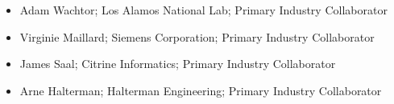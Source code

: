 \documentclass[11pt]{article}
\begin{document}
\begin{itemize}


\item Adam Wachtor; Los Alamos National Lab; Primary Industry Collaborator 

\item Virginie Maillard; Siemens Corporation; Primary Industry Collaborator 

\item James Saal; Citrine Informatics; Primary Industry Collaborator 

\item Arne Halterman; Halterman Engineering; Primary Industry Collaborator 

\end{itemize}
\end{document}
